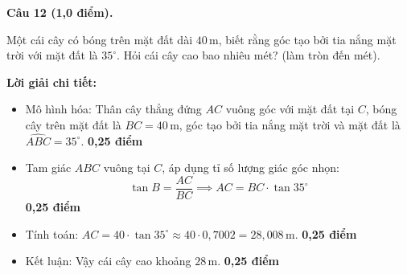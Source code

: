 \documentclass[12pt,a4paper]{article}
\begin{document}
\noindent\textbf{Câu 12 (1,0 điểm).}
\par\noindent
\begin{minipage}[t]{0.70\linewidth}
Một cái cây có bóng trên mặt đất dài $40\,\text{m}$, biết rằng góc tạo bởi tia nắng mặt trời với mặt đất là $35^\circ$. Hỏi cái cây cao bao nhiêu mét? (làm tròn đến mét).

\vspace{1.5mm}
\noindent\textbf{Lời giải chi tiết:}
\begin{itemize}[leftmargin=14pt, itemsep=1.5pt, parsep=0pt]
  \item Mô hình hóa: Thân cây thẳng đứng $AC$ vuông góc với mặt đất tại $C$, bóng cây trên mặt đất là $BC = 40\,\text{m}$, góc tạo bởi tia nắng mặt trời và mặt đất là $\widehat{ABC} = 35^\circ$. \dotfill \textbf{0,25 điểm}
  \item Tam giác $ABC$ vuông tại $C$, áp dụng tỉ số lượng giác góc nhọn:
  \[
    \tan B = \frac{AC}{BC} \implies AC = BC \cdot \tan 35^\circ
  \] \dotfill \textbf{0,25 điểm}
  \item Tính toán: $AC = 40 \cdot \tan 35^\circ \approx 40 \cdot 0{,}7002 = 28{,}008\,\text{m}$. \dotfill \textbf{0,25 điểm}
  \item Kết luận: Vậy cái cây cao khoảng $28\,\text{m}$. \dotfill \textbf{0,25 điểm}
\end{itemize}
\end{minipage}\hfill
\begin{minipage}[t]{0.28\linewidth}
\vspace{-2mm}
\centering
{}
\end{minipage}
\end{document}

